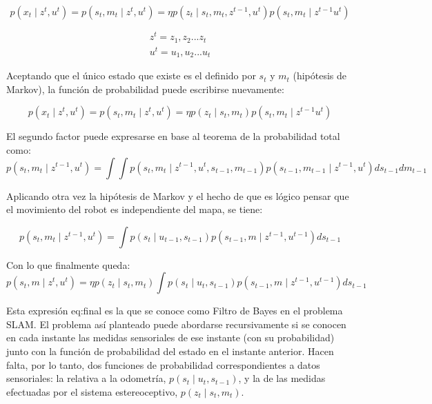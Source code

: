 \begin{equation}\label{eq:prob_estado}
    p(x_{t}\mid z^{t},u^{t}) = p(s_{t},m_{t}\mid z^{t},u^{t})=\eta p(z_{t}\mid s_{t},m_{t},z^{t-1},u^{t})p(s_{t},m_{t}\mid z^{t-1}u^{t})
\end{equation}


\begin{eqnarray}
    z^{t} = z_{1},z_{2}...z_{t} \nonumber\\
    u^{t} = u_{1},u_{2}...u_{t}
\end{eqnarray}

Aceptando que el único estado que existe es el definido por $s_{t}$ y $m_{t}$ (hipótesis de Markov), la función de probabilidad puede escribirse nuevamente:

\begin{equation}\label{eq:prob_markov}
    p(x_{t}\mid z^{t},u^{t}) = p(s_{t},m_{t}\mid z^{t},u^{t}) = \eta p(z_{t}\mid s_{t},m_{t})p(s_{t},m_{t}\mid z^{t-1}u^{t})
\end{equation}

El segundo factor puede expresarse en base al teorema de la probabilidad total como:
\begin{equation}\label{eq:prob_total}
    p(s_{t},m_{t}\mid z^{t-1},u^{t}) = \int\int p(s_{t},m_{t}\mid z^{t-1},u^{t},s_{t-1},m_{t-1})p(s_{t-1},m_{t-1}\mid z^{t-1},u^{t})ds_{t-1}dm_{t-1}
\end{equation}

Aplicando otra vez la hipótesis de Markov y el hecho de que es lógico pensar que el movimiento del robot es independiente del mapa, se tiene:

\begin{equation}\label{eq:termino2}
    p(s_{t},m_{t}\mid z^{t-1},u^{t}) = \int p(s_{t}\mid u_{t-1},s_{t-1})p(s_{t-1},m\mid z^{t-1},u^{t-1})ds_{t-1}
\end{equation}


Con lo que finalmente queda:
\begin{equation}\label{eq:final}
  p(s_{t},m\mid z^{t},u^{t}) = \eta p(z_{t}\mid s_{t},m_{t})\int p(s_{t}\mid u_{t},s_{t-1})p(s_{t-1},m\mid z^{t-1},u^{t-1})ds_{t-1}
\end{equation}

Esta expresión eq:final es la que se conoce como Filtro de Bayes en el problema SLAM. El problema así planteado puede abordarse recursivamente si se conocen en cada instante las medidas sensoriales de ese instante (con su probabilidad) junto con la función de probabilidad del estado en el instante anterior.
Hacen falta, por lo tanto, dos funciones de probabilidad correspondientes a datos sensoriales: la relativa a la odometría, $p(s_{t}\mid u_{t},s_{t-1})$, y la de las medidas efectuadas por el sistema estereoceptivo, $p(z_{t}\mid s_{t},m_{t})$.

